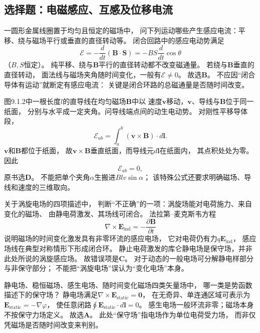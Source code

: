 
\subsection{选择题：电磁感应、互感及位移电流}

\problemtext 一圆形金属线圈置于均匀且恒定的磁场中，
问下列运动哪些产生感应电流：平移、绕与磁场平行或垂直的直径转动等。
\workings
闭合回路中的感应电动势满足
\[
\mathcal E=-\frac{d}{dt}(\bm B\cdot\bm S)
=-BS\frac d{dt}\cos\theta
\]
（$B,S$恒定）。
纯平移、绕与$\bm B$平行的直径转动都不改变磁通量。
若绕与$\bm B$垂直的直径转动，
面法线与磁场夹角随时间变化，一般有$\mathcal E\ne0$。
故选\textbf{B}。
\crosscheck 不应因“闭合导体有运动”就断定有感应电流：
关键是闭合环路的总磁通量是否随时间改变。

\problemtext 图9.1.2中一根长度$l$的直导线在均匀磁场$\bm B$中以
速度$\bm v$移动，$\bm v$、导线与$\bm B$位于同一纸面，
分别与水平成一定夹角。问导线端点间的动生电动势。
\workings
对刚性平移导体段，
\[
\mathcal E_{ab}=\int_a^b(\bm v\times\bm B)\cdot d\bm l.
\]
$\bm v$和$\bm B$都位于纸面，
故$\bm v\times\bm B$垂直纸面，而导线元$d\bm l$在纸面内，
其点积处处为零。因此
\[
\boxed{\mathcal E_{ab}=0},
\]
原书选\textbf{D}。
\crosscheck 不能把单个夹角$\alpha$生搬进$Blv\sin\alpha$；
该特殊公式还要求明确磁场、导线和速度的三维取向。

\problemtext 关于涡旋电场的四项描述中，
判断“不正确”的一项：涡旋场能对电荷施力、来自变化的磁场、
由静电荷激发、其场线可闭合。
\workings
法拉第--麦克斯韦方程
\[
\nabla\times\bm E_{\mathrm{ind}}
=-\frac{\partial\bm B}{\partial t}
\]
说明磁场的时间变化激发具有非零环流的感应电场，
它对电荷仍有力$q\bm E_{\mathrm{ind}}$，
感应场线在典型对称情形下形成闭合环。
静止电荷激发的库仑静电场是保守场，并非此处所说的涡旋感应场。
故错误项是\textbf{C}。
\crosscheck 对于动态的一般电场可分解静电样部分与非保守部分；
不能把“涡旋电场”误认为“变化电场”本身。

\problemtext 静电场、稳恒磁场、感生电场、随时间变化磁场四类矢量场中，
哪一类是势函数描述下的保守场？
\workings
静电场满足$\nabla\times\bm E_{\mathrm{static}}=\bm0$，
在无奇异、单连通区域可表示为
$\bm E_{\mathrm{static}}=-\nabla\varphi$，
使任意闭路$\oint\bm E_{\mathrm{static}}\cdot d\bm l=0$。
感生电场一般环流非零；磁场本身不按保守力场定义。
故选\textbf{A}。
\crosscheck 此处“保守场”指电场作为单位电荷受力场，
而非仅凭磁场是否随时间改变来判别。

